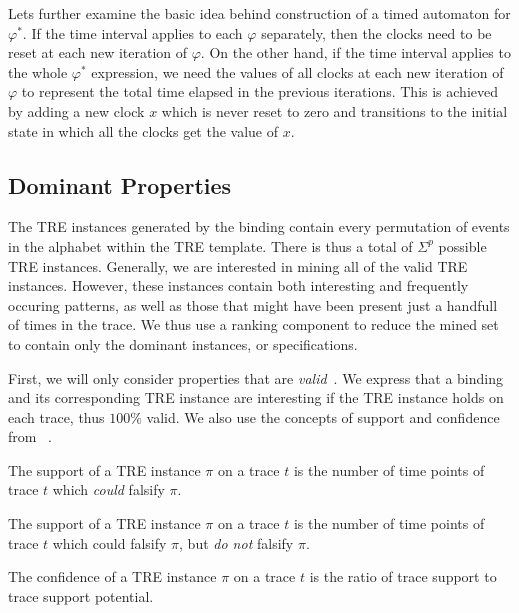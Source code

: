 \documentclass[]{sigplanconf}
\begin{document}
Lets further examine the basic idea behind construction of a timed automaton for $\varphi^*$. If the time interval applies to each $\varphi$ separately, then the clocks need to be reset at each new iteration of $\varphi$. On the other hand, if the time interval applies to the whole $\varphi^*$ expression, we need the values of all clocks at each new iteration of $\varphi$ to represent the total time elapsed in the previous iterations. This is achieved by adding a new clock $x$ which is never reset to zero and transitions to the initial state in which all the clocks get the value of $x$.


\subsection{Dominant Properties}

The TRE instances generated by the binding contain every permutation of events in the alphabet within the TRE template. There is thus a total of $\Sigma^p$ possible TRE instances. Generally, we are interested in mining all of the valid TRE instances.
However, these instances contain both interesting and frequently occuring patterns, as well as those that might have been present just a handfull of times in the trace. We thus use a ranking component to reduce the mined set to contain only the dominant instances, or specifications.

First, we will only consider properties that are \emph{valid}~\cite{lemieux2015general}. We express that a binding and its corresponding TRE instance are interesting if the TRE instance holds on each trace, thus $100 \%$ valid. We also use the concepts of support and confidence from ~\cite{lemieux2015general}.

\begin{defns}
The support of a TRE instance $\pi$ on a trace $t$ is the number of time points of trace $t$ which \emph{could} falsify $\pi$.
\end{defns}

\begin{defns}[Support]
The support of a TRE instance $\pi$ on a trace $t$ is the number of time points of trace $t$ which could falsify $\pi$, but \emph{do not} falsify $\pi$.
\end{defns}

\begin{defns}[Confidence]
The confidence of a TRE instance $\pi$ on a trace $t$ is the ratio of trace support to trace support potential.
\end{defns}
\end{document}
